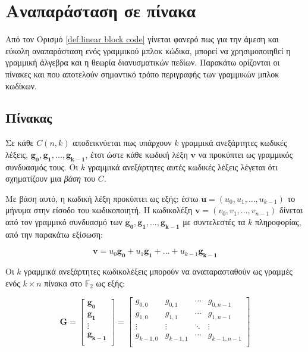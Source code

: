 

\section{Αναπαράσταση σε πίνακα}

Από τον Ορισμό \ref{def:linear block code} γίνεται φανερό πως για την άμεση και εύκολη αναπαράσταση ενός γραμμικού μπλοκ κώδικα, μπορεί να χρησιμοποιηθεί η γραμμική άλγεβρα και η θεωρία διανυσματικών πεδίων. Παρακάτω ορίζονται οι πίνακες  και  που αποτελούν σημαντικό τρόπο περιγραφής των γραμμικών μπλοκ κωδίκων.

\subsection{Πίνακας }
Σε κάθε $C(n,k)$ αποδεικνύεται πως υπάρχουν $k$ γραμμικά ανεξάρτητες κωδικές λέξεις, $\mathbf{g_0, g_1, ..., g_{k-1}}$, έτσι ώστε κάθε κωδική λέξη $\mathbf{v}$ να προκύπτει ως γραμμικός συνδυασμός τους. Οι $k$ γραμμικά ανεξάρτητες αυτές κωδικές λέξεις λέγεται ότι σχηματίζουν μια \textit{βάση} του $C$.

Με βάση αυτό, η κωδική λέξη προκύπτει ως εξής: έστω $\mathbf{u} = (u_0, u_1, ..., u_{k-1})$ το μήνυμα στην είσοδο του κωδικοποιητή. Η κωδικολέξη $\mathbf{v} = (v_0, v_1, ..., v_{n-1})$ δίνεται από τον γραμμικό συνδυασμό των $\mathbf{g_0, g_1, ..., g_{k-1}}$ με συντελεστές τα $k$  πληροφορίας, από την παρακάτω εξίσωση:

\begin{equation}
\mathbf{v}=u_0\mathbf{g_0}+u_1\mathbf{g_1}+...+u_{k-1}\mathbf{g_{k-1}}
\label{eq:codeword formation}
\end{equation}

Οι $k$ γραμμικά ανεξάρτητες κωδικολέξεις μπορούν να αναπαρασταθούν ως γραμμές ενός $k\times n$ πίνακα στο $\mathbb{F}_2$ ως εξής:

\begin{equation}
\mathbf{G}=\begin{bmatrix}\mathbf{g_0}\\\mathbf{g_1}\\\vdots\\\mathbf{g_{k-1}}\\\end{bmatrix}=\begin{bmatrix}g_{0,0} & g_{0,1} & \cdots & g_{0,n-1}\\g_{1,0} & g_{1,1} & \cdots & g_{1,n-1}\\\vdots & \vdots & \ddots & \vdots\\g_{k-1,0} & g_{k-1,1} & \cdots & g_{k-1,n-1}\\\end{bmatrix}
\label{eq:generator matrix}
\end{equation}


